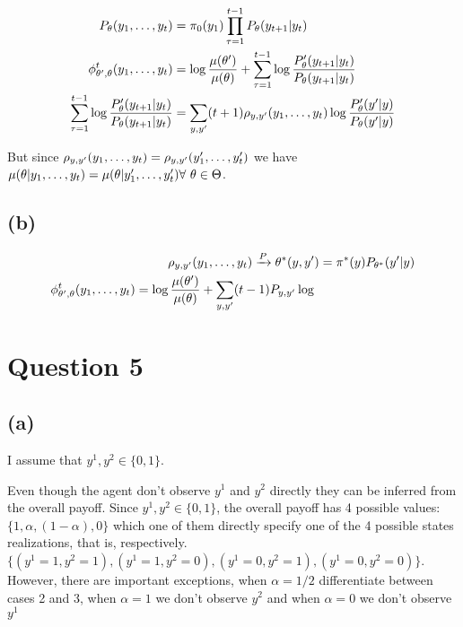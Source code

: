 \documentclass{article}
\begin{document}
\begin{equation}
\begin{split}
  P_\theta(y_1, \ldots, y_t)     & = \pi_0(y_1) \prod_{\tau = 1}^{t-1} P_\theta(y_{t+1} |y_t) \\
  \phi_{\theta', \theta}^t(y_1, \ldots, y_t)     & = \log \frac{\mu(\theta')}{\mu(\theta)} + \sum_{\tau = 1}^{t-1}
                       \log \frac{P_\theta'(y_{t+1}|y_t)}{P_\theta(y_{t+1}|y_t)} \\
   \sum_{\tau = 1}^{t-1} \log \frac{P_\theta'(y_{t+1}|y_t)}{P_\theta(y_{t+1}|y_t)} & =
                       \sum_{y, y'} (t+1) \rho_{y, y'}(y_1, \ldots, y_t)
                       \log \frac{P_\theta'(y'|y)}{P_\theta(y'|y)}
\end{split}
\end{equation}

But since $\rho_{y, y'}(y_1, \ldots, y_t) = \rho_{y, y'}(y_1', \ldots, y_t')$ we
have $\mu(\theta| y_1, \ldots, y_t) = \mu(\theta | y_1', \ldots, y_t') 
\forall\ \theta \in \Theta$.

\subsection{(b)} %

\begin{equation}
\begin{split}
  \rho_{y,y'}(y_1, \ldots, y_t) \xrightarrow{P} \theta^*(y, y') & =
                     \pi^*(y) P_{\theta^*}(y'|y) \\
  \phi_{\theta', \theta}^t(y_1, \ldots, y_t) = \log \frac{\mu(\theta')}{\mu(\theta)} +
      \sum_{y, y'}(t-1) P_{y, y'} \log \frac{}{}
\end{split}
\end{equation}


\section{Question 5}%
\label{sec:Question 5}

\subsection{(a)} %

I assume that $y^1, y^2 \in \{0, 1\}$.

Even though the agent don't observe $y^1$ and $y^2$ directly they can be inferred
from the overall payoff. Since $y^1, y^2 \in \{0, 1\}$, the overall payoff has 4 
possible values: $\{1, \alpha, (1-\alpha), 0\}$ which one of them directly
specify one of the 4 possible states realizations, that is, respectively.
$\{(y^1 = 1, y^2 = 1), (y^1 = 1, y^2 = 0), (y^1 = 0, y^2 = 1),(y^1 = 0, y^2 = 0)\}$.
However, there are important exceptions, when $\alpha = 1/2$ differentiate between cases
2 and 3, when $\alpha = 1$ we don't observe $y^2$ and when $\alpha = 0$ we don't
observe $y^1$
\end{document}
